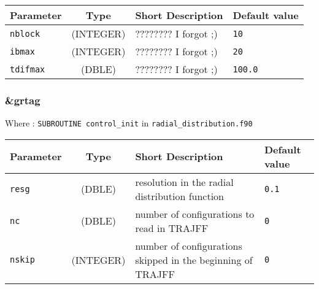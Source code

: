 \documentclass[a4paper]{article}
\begin{document}
\begin{longtable}{l|c|m{8cm}|m{2cm}}
\hline
\hline
Parameter        &  Type              &          Short Description                                                          & Default value \\
\hline
\hline
\rule[-0.75cm]{0cm}{1.5cm}
\verb?nblock?    & (INTEGER)          & ???????? I forgot ;)                                                                & \verb?10? \\
\hline
\rule[-0.75cm]{0cm}{1.5cm}
\verb?ibmax?     &  (INTEGER)         & ???????? I forgot ;)                                                                & \verb?20? \\
\hline
\rule[-0.75cm]{0cm}{1.5cm}
\verb?tdifmax?   & (DBLE)             & ???????? I forgot ;)                                                                & \verb?100.0? \\
\hline
\hline
\end{longtable}


\subsubsection{\&grtag}

Where : \verb?SUBROUTINE control_init? in \verb?radial_distribution.f90?
\newline

\begin{longtable}{l|c|m{8cm}|m{2cm}}
\hline
\hline
Parameter        &  Type              &          Short Description                                                          & Default value \\
\hline
\hline
\rule[-0.75cm]{0cm}{1.5cm}
\verb?resg?      & (DBLE)             & resolution in the radial distribution function                                      & \verb?0.1? \\
\rule[-0.75cm]{0cm}{1.5cm}
\verb?nc?        & (DBLE)             & number of configurations to read in TRAJFF                                          & \verb?0? \\
\rule[-0.75cm]{0cm}{1.5cm}
\verb?nskip?     & (INTEGER)          & number of configurations skipped in the beginning of TRAJFF                         & \verb?0? \\
\hline
\hline
\end{longtable}
\end{document}
